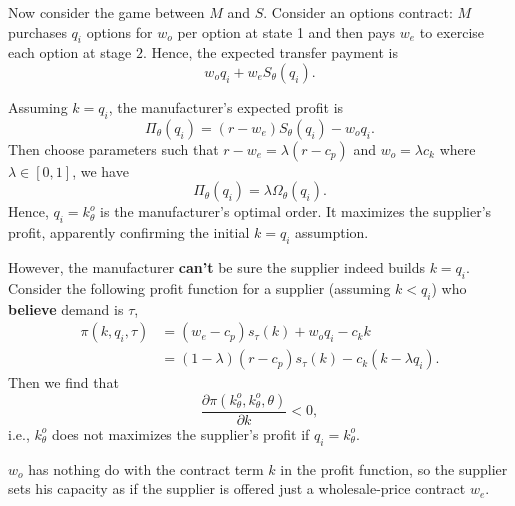 Now consider the game between $M$ and $S$. Consider an options contract: $M$ purchases $q_i$ options for $w_o$ per option at state 1 and then pays $w_e$ to exercise each option at stage $2$. Hence, the expected transfer payment is 
\begin{equation*}
    w_o q_i+w_e S_\theta(q_i).
\end{equation*}

Assuming $k=q_i$, the manufacturer's expected profit is
\begin{equation*}
    \Pi_\theta(q_i)=(r-w_e)S_\theta(q_i)-w_o q_i.
\end{equation*}
Then choose parameters such that $r-w_e=\lambda(r-c_p)$ and $w_o=\lambda c_k$ where $\lambda\in[0,1]$, we have
\begin{equation*}
    \Pi_\theta(q_i)=\lambda\Omega_\theta(q_i).
\end{equation*}
Hence, $q_i=k_\theta^o$ is the manufacturer's optimal order. It maximizes the supplier's profit, apparently confirming the initial $k=q_i$ assumption.

However, the manufacturer \textbf{can't} be sure the supplier indeed builds $k=q_i$. Consider the following profit function for a supplier (assuming $k<q_i$) who \textbf{believe} demand is $\tau$,
\begin{align*}
    \pi(k,q_i,\tau)&=(w_e-c_p)s_\tau(k)+w_o q_i - c_k k\\
    &=(1-\lambda)(r-c_p)s_\tau(k)-c_k(k-\lambda q_i).
\end{align*}
Then we find that
$$\frac{\partial\pi(k_\theta^o,k_\theta^o,\theta)}{\partial k}<0,$$
i.e., $k_\theta^o$ does not maximizes the supplier's profit if $q_i=k_\theta^o$. 
\begin{note}
    $w_o$ has nothing do with the contract term $k$ in the profit function, so the supplier sets his capacity as if the supplier is offered just a wholesale-price contract $w_e$. 
\end{note}


